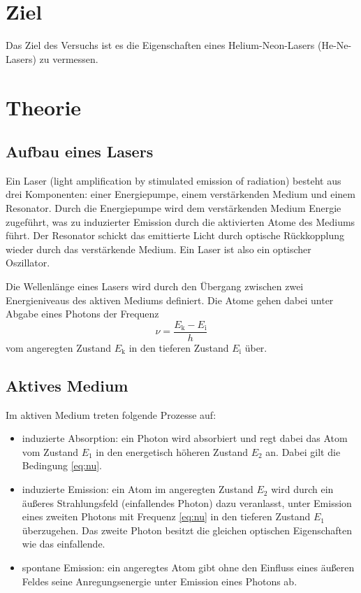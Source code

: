 \section{Ziel}
Das Ziel des Versuchs ist es die Eigenschaften eines Helium-Neon-Lasers (He-Ne-Lasers) zu vermessen. 

\section{Theorie}
\label{sec:Theorie}

\subsection{Aufbau eines Lasers}
Ein Laser (light amplification by stimulated emission of radiation) besteht aus drei Komponenten: einer Energiepumpe, einem verstärkenden Medium und einem Resonator.
Durch die Energiepumpe wird dem verstärkenden Medium Energie zugeführt, was zu induzierter Emission durch die aktivierten Atome des Mediums führt. Der Resonator schickt das emittierte Licht durch optische Rückkopplung wieder durch das verstärkende Medium. Ein Laser ist also ein optischer Oszillator.

Die Wellenlänge eines Lasers wird durch den Übergang zwischen zwei Energieniveaus des aktiven Mediums definiert. Die Atome gehen dabei unter Abgabe eines Photons der Frequenz
\begin{equation}
    \nu = \frac{E_\text{k} - E_\text{i}}{h}
    \label{eq:nu}
\end{equation}
vom angeregten Zustand $E_\text{k}$ in den tieferen Zustand $E_\text{i}$ über.

\subsection{Aktives Medium}
Im aktiven Medium treten folgende Prozesse auf:
\begin{itemize}
    \item induzierte Absorption: ein Photon wird absorbiert und regt dabei das Atom vom Zustand $E_1$ in den energetisch höheren Zustand $E_2$ an. Dabei gilt die Bedingung \eqref{eq:nu}.
    \item induzierte Emission: ein Atom im angeregten Zustand $E_2$ wird durch ein äußeres Strahlungsfeld (einfallendes Photon) dazu veranlasst, unter Emission eines zweiten Photons mit Frequenz \eqref{eq:nu} in den tieferen Zustand $E_1$ überzugehen. Das zweite Photon besitzt die gleichen optischen Eigenschaften wie das einfallende.
    \item spontane Emission: ein angeregtes Atom gibt ohne den Einfluss eines äußeren Feldes seine Anregungsenergie unter Emission eines Photons ab.
\end{itemize}

